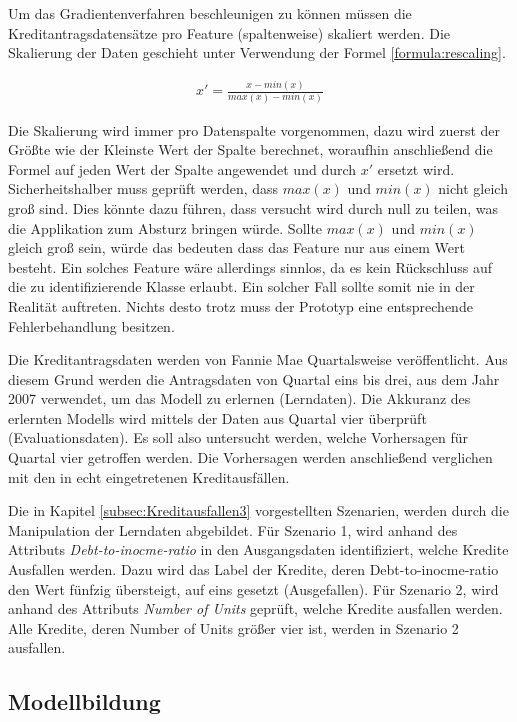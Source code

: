 Um das Gradientenverfahren beschleunigen zu können müssen die Kreditantragsdatensätze pro Feature (spaltenweise) skaliert werden. Die Skalierung der Daten geschieht unter Verwendung der Formel \ref{formula:rescaling}.  

\begin{align}
\label{formula:rescaling}
x' = \frac{x-min(x)}{max(x)-min(x)}
\end{align}

Die Skalierung wird immer pro Datenspalte vorgenommen, dazu wird zuerst der Größte wie der Kleinste Wert der Spalte berechnet, woraufhin anschließend die Formel auf jeden Wert der Spalte angewendet und durch $x'$ ersetzt wird.
Sicherheitshalber muss geprüft werden, dass $max(x)$ und $min(x)$ nicht gleich groß sind. Dies könnte dazu führen, dass versucht wird durch null zu teilen, was die Applikation zum Absturz bringen würde. Sollte $max(x)$ und $min(x)$ gleich groß sein, würde das bedeuten dass das Feature nur aus einem Wert besteht. Ein solches Feature wäre allerdings sinnlos, da es kein Rückschluss auf die zu identifizierende Klasse erlaubt. Ein solcher Fall sollte somit nie in der Realität auftreten. Nichts desto trotz muss der Prototyp eine entsprechende Fehlerbehandlung besitzen.

Die Kreditantragsdaten werden von Fannie Mae Quartalsweise veröffentlicht. Aus diesem Grund werden die Antragsdaten von Quartal eins bis drei, aus dem Jahr 2007 verwendet, um das Modell zu erlernen (Lerndaten). Die Akkuranz des erlernten Modells wird mittels der Daten aus Quartal vier überprüft (Evaluationsdaten). Es soll also untersucht werden, welche Vorhersagen für Quartal vier getroffen werden. Die Vorhersagen werden anschließend verglichen mit den in echt eingetretenen Kreditausfällen.

Die in Kapitel \ref{subsec:Kreditausfallen3} vorgestellten Szenarien, werden durch die Manipulation der Lerndaten abgebildet. Für Szenario 1, wird anhand des Attributs \emph{Debt-to-inocme-ratio} in den Ausgangsdaten identifiziert, welche Kredite Ausfallen werden. Dazu wird das Label der Kredite, deren Debt-to-inocme-ratio den Wert fünfzig übersteigt, auf eins gesetzt (Ausgefallen). Für Szenario 2, wird anhand des Attributs \emph{Number of Units} geprüft, welche Kredite ausfallen werden. Alle Kredite, deren Number of Units größer vier ist, werden in Szenario 2 ausfallen. 

\subsection{Modellbildung}
\label{subsec:Neuro31}

